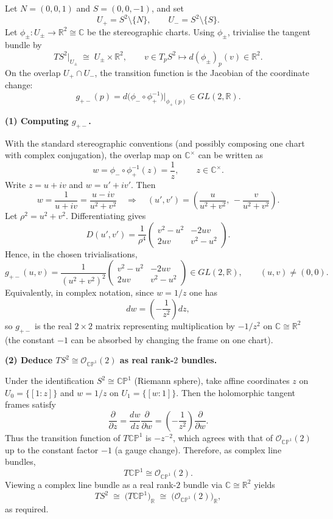 \begin{solution}
Let $N=(0,0,1)$ and $S=(0,0,-1)$, and set
\[
U_+ = S^2\setminus\{N\},\qquad U_- = S^2\setminus\{S\}.
\]
Let $\phi_\pm:U_\pm\to \mathbb{R}^2\cong\mathbb{C}$ be the stereographic charts.
Using $\phi_\pm$, trivialise the tangent bundle by
\[
TS^2|_{U_\pm}\;\cong\; U_\pm\times \mathbb{R}^2,\qquad
v\in T_pS^2\longmapsto d(\phi_\pm)_p(v)\in \mathbb{R}^2.
\]
On the overlap $U_+\cap U_-$, the transition function is the Jacobian of the coordinate change:
\[
g_{+-}(p)=d\bigl(\phi_-\circ \phi_+^{-1}\bigr)\Big|_{\phi_+(p)}\in GL(2,\mathbb{R}).
\]

\par\medskip\noindent\textbf{(1) Computing $g_{+-}$.}\par\smallskip

With the standard stereographic conventions (and possibly composing one chart with complex conjugation),
the overlap map on $\mathbb{C}^\times$ can be written as
\[
w=\phi_-\circ\phi_+^{-1}(z)=\frac{1}{z},\qquad z\in\mathbb{C}^\times.
\]
Write $z=u+iv$ and $w=u'+iv'$. Then
\[
w=\frac{1}{u+iv}=\frac{u-iv}{u^2+v^2}
\quad\Longrightarrow\quad
(u',v')=\left(\frac{u}{u^2+v^2},\,-\frac{v}{u^2+v^2}\right).
\]
Let $\rho^2=u^2+v^2$. Differentiating gives
\[
D(u',v')
=
\frac{1}{\rho^4}
\begin{pmatrix}
	v^2-u^2 & -2uv\\
	2uv & v^2-u^2
\end{pmatrix}.
\]
Hence, in the chosen trivialisations,
\[
\boxed{
	g_{+-}(u,v)=
	\frac{1}{(u^2+v^2)^2}
	\begin{pmatrix}
		v^2-u^2 & -2uv\\
		2uv & v^2-u^2
	\end{pmatrix}
	\in GL(2,\mathbb{R}),\qquad (u,v)\neq(0,0).
}
\]
Equivalently, in complex notation, since $w=1/z$ one has
\[
dw=\left(-\frac{1}{z^2}\right)dz,
\]
so $g_{+-}$ is the real $2\times 2$ matrix representing multiplication by $-1/z^2$ on $\mathbb{C}\cong\mathbb{R}^2$
(the constant $-1$ can be absorbed by changing the frame on one chart).

\par\medskip\noindent\textbf{(2) Deduce $TS^2\cong \mathcal{O}_{\mathbb{CP}^1}(2)$ as real rank-$2$ bundles.}\par\smallskip

Under the identification $S^2\cong\mathbb{CP}^1$ (Riemann sphere), take affine coordinates
$z$ on $U_0=\{[1:z]\}$ and $w=1/z$ on $U_1=\{[w:1]\}$. Then the holomorphic tangent frames satisfy
\[
\frac{\partial}{\partial z}
=
\frac{dw}{dz}\frac{\partial}{\partial w}
=
\left(-\frac{1}{z^2}\right)\frac{\partial}{\partial w}.
\]
Thus the transition function of $T\mathbb{CP}^1$ is $-z^{-2}$, which agrees with that of $\mathcal{O}_{\mathbb{CP}^1}(2)$
up to the constant factor $-1$ (a gauge change). Therefore, as complex line bundles,
\[
T\mathbb{CP}^1 \cong \mathcal{O}_{\mathbb{CP}^1}(2).
\]
Viewing a complex line bundle as a real rank-$2$ bundle via $\mathbb{C}\cong\mathbb{R}^2$ yields
\[
TS^2 \;\cong\; \bigl(T\mathbb{CP}^1\bigr)_{\mathbb{R}}
\;\cong\; \bigl(\mathcal{O}_{\mathbb{CP}^1}(2)\bigr)_{\mathbb{R}},
\]
as required.



\end{solution}
